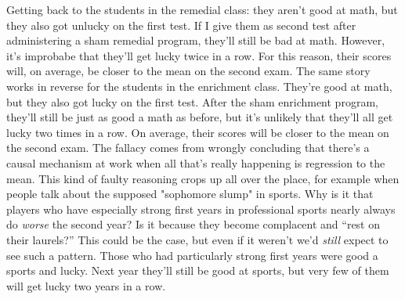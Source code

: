 \documentclass[12pt]{article}
\begin{document}
Getting back to the students in the remedial class: they aren't good at math, but they also got unlucky on the first test.
If I give them as second test after administering a sham remedial program, they'll still be bad at math.
However, it's improbabe that they'll get lucky twice in a row.
For this reason, their scores will, on average, be closer to the mean on the second exam.
The same story works in reverse for the students in the enrichment class.
They're good at math, but they also got lucky on the first test.
After the sham enrichment program, they'll still be just as good a math as before, but it's unlikely that they'll all get lucky two times in a row.
On average, their scores will be closer to the mean on the second exam.
The fallacy comes from wrongly concluding that there's a causal mechanism at work when all that's really happening is regression to the mean.
This kind of faulty reasoning crops up all over the place, for example when people talk about the supposed "sophomore slump" in sports.
Why is it that players who have especially strong first years in professional sports nearly always do \emph{worse} the second year?
Is it because they become complacent and ``rest on their laurels?''
This could be the case, but even if it weren't we'd \emph{still} expect to see such a pattern.
Those who had particularly strong first years were good a sports and lucky.
Next year they'll still be good at sports, but very few of them will get lucky two years in a row.
\end{document}
